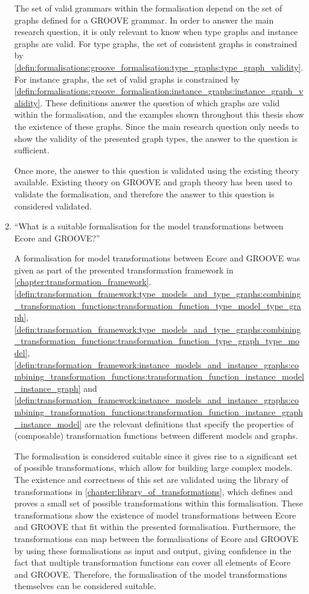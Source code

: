 \begin{enumerate}
    The set of valid grammars within the formalisation depend on the set of graphs defined for a GROOVE grammar. In order to answer the main research question, it is only relevant to know when type graphs and instance graphs are valid. For type graphs, the set of consistent graphs is constrained by \cref{defin:formalisations:groove_formalisation:type_graphs:type_graph_validity}. For instance graphs, the set of valid graphs is constrained by \cref{defin:formalisations:groove_formalisation:instance_graphs:instance_graph_validity}. These definitions answer the question of which graphs are valid within the formalisation, and the examples shown throughout this thesis show the existence of these graphs. Since the main research question only needs to show the validity of the presented graph types, the answer to the question is sufficient.
    
    Once more, the answer to this question is validated using the existing theory available. Existing theory on GROOVE and graph theory has been used to validate the formalisation, and therefore the answer to this question is considered validated.
    
    \item ``What is a suitable formalisation for the model transformations between Ecore and GROOVE?'' 
    
    A formalisation for model transformations between Ecore and GROOVE was given as part of the presented transformation framework in \cref{chapter:transformation_framework}. \cref{defin:transformation_framework:type_models_and_type_graphs:combining_transformation_functions:transformation_function_type_model_type_graph}, \cref{defin:transformation_framework:type_models_and_type_graphs:combining_transformation_functions:transformation_function_type_graph_type_model}, \cref{defin:transformation_framework:instance_models_and_instance_graphs:combining_transformation_functions:transformation_function_instance_model_instance_graph} and \cref{defin:transformation_framework:instance_models_and_instance_graphs:combining_transformation_functions:transformation_function_instance_graph_instance_model} are the relevant definitions that specify the properties of (composable) transformation functions between different models and graphs.
    
    The formalisation is considered suitable since it gives rise to a significant set of possible transformations, which allow for building large complex models. The existence and correctness of this set are validated using the library of transformations in \cref{chapter:library_of_transformations}, which defines and proves a small set of possible transformations within this formalisation. These transformations show the existence of model transformations between Ecore and GROOVE that fit within the presented formalisation. Furthermore, the transformations can map between the formalisations of Ecore and GROOVE by using these formalisations as input and output, giving confidence in the fact that multiple transformation functions can cover all elements of Ecore and GROOVE. Therefore, the formalisation of the model transformations themselves can be considered suitable.
    

\end{enumerate}
